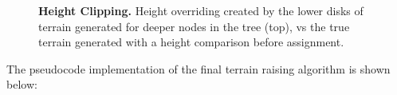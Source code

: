 \documentclass[10pt,letterpaper]{article}
\begin{document}
\begin{figure}[h!]
\caption{{\bf Height Clipping.} Height overriding created by the lower disks of terrain generated for deeper nodes in the tree (top), vs the true terrain generated with a height comparison before assignment.}
\label{fig3}
\end{figure}

The pseudocode implementation of the final terrain raising algorithm is shown below:
\end{document}
